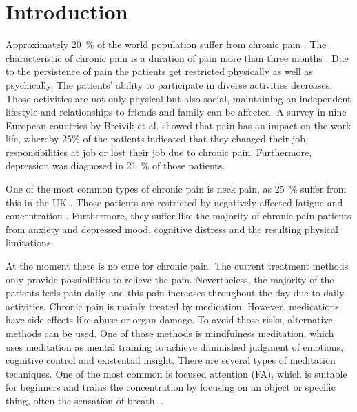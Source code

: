 \section{Introduction}
Approximately 20~\% of the world population suffer from chronic pain \cite{Macfarlanea2016}. The characteristic of chronic pain is a duration of pain more than three months \cite{Mello2016}. Due to the persistence of pain the patients get restricted physically as well as psychically. The patients’ ability to participate in diverse activities decreases. Those activities are not only physical but also social, maintaining an independent lifestyle and relationships to friends and family can be affected. A survey in nine European countries by Breivik et al. \cite{Breivik2006} showed that pain has an impact on the work life, whereby 25\% of the patients indicated that they changed their job, responsibilities at job or lost their job due to chronic pain. Furthermore, depression was diagnosed in 21~\% of those patients. \cite{Breivik2006} 

One of the most common types of chronic pain is neck pain, as 25~\% suffer from this in the UK \cite{Macfarlanea2016}. Those patients are restricted by negatively affected fatigue and concentration \cite{vanRanderaat2016}. Furthermore, they suffer like the majority of chronic pain patients from anxiety and depressed mood, cognitive distress and the resulting physical limitations. \cite{Gross2013} 

At the moment there is no cure for chronic pain. The current treatment methods only provide possibilities to relieve the pain. \cite{Pope2017,marcus2009} Nevertheless, the majority of the patients feels pain daily and this pain increases throughout the day due to daily activities. \cite{Breivik2006} 
Chronic pain is mainly treated by medication. However, medications have side effects like abuse or organ damage. To avoid those risks, alternative methods can be used. \cite{Pope2017,marcus2009, stein2007} One of those methods is mindfulness meditation, which uses meditation as mental training to achieve diminished judgment of emotions, cognitive control and existential insight. \cite{marcus2009} There are several types of meditation techniques. One of the most common is  focused attention (FA), which is suitable for beginners and trains the concentration by focusing on an object or specific thing, often the sensation of breath. \cite{Zeidan2016, Kabat1982}. 

